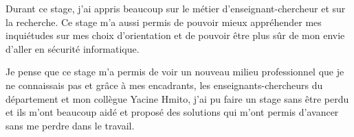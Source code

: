 Durant ce stage, j'ai appris beaucoup sur le métier d'enseignant-chercheur et sur la recherche. Ce stage m'a aussi permis de pouvoir mieux appréhender mes inquiétudes sur mes choix d'orientation et de pouvoir être plus sûr de mon envie d'aller en sécurité informatique.

Je pense que ce stage m'a permis de voir un nouveau milieu professionnel que je ne connaissais pas et grâce à mes encadrants, les enseignants-chercheurs du département et mon collègue Yacine Hmito, j'ai pu faire un stage sans être perdu et ils m'ont beaucoup aidé et proposé des solutions qui m'ont permis d'avancer sans me perdre dans le travail.
